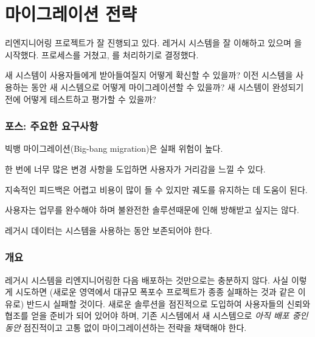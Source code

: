 \documentclass[a4paper,10pt,twoside]{book}
\begin{document}
	\renewcommand{\nnbb}[2]{} %
	\sloppy
\fi
\chapter{마이그레이션 전략}


\label{pat:AlwaysHaveARunningVersion}

리엔지니어링 프로젝트가 잘 진행되고 있다. 레거시 시스템을 잘 이해하고 있으며 을 시작했다.  프로세스를 거쳤고, 를 처리하기로 결정했다.

새 시스템이 사용자들에게 받아들여질지 어떻게 확신할 수 있을까? 이전 시스템을 사용하는 동안 새 시스템으로 어떻게 마이그레이션할 수 있을까? 새 시스템이 완성되기 전에 어떻게 테스트하고 평가할 수 있을까?

\subsection*{포스: 주요한 요구사항}

\begin{bulletlist}
\item 빅뱅 마이그레이션(Big-bang migration)은 실패 위험이 높다.

\item 한 번에 너무 많은 변경 사항을 도입하면 사용자가 거리감을 느낄 수 있다.

\item 지속적인 피드백은 어렵고 비용이 많이 들 수 있지만 궤도를 유지하는 데 도움이 된다.

\item 사용자는 업무를 완수해야 하며 불완전한 솔루션때문에 인해 방해받고 싶지는 않다.

\item 레거시 데이터는 시스템을 사용하는 동안 보존되어야 한다.
\end{bulletlist}

\subsection*{개요}

레거시 시스템을 리엔지니어링한 다음 배포하는 것만으로는 충분하지 않다. 사실 이렇게 시도하면 (새로운 영역에서 대규모 폭포수 프로젝트가 종종 실패하는 것과 같은 이유로) 반드시 실패할 것이다. 새로운 솔루션을 점진적으로 도입하여 사용자들의 신뢰와 협조를 얻을 준비가 되어 있어야 하며, 기존 시스템에서 새 시스템으로 \emph{아직 배포 중인 동안} 점진적이고 고통 없이 마이그레이션하는 전략을 채택해야 한다.
\end{document}
